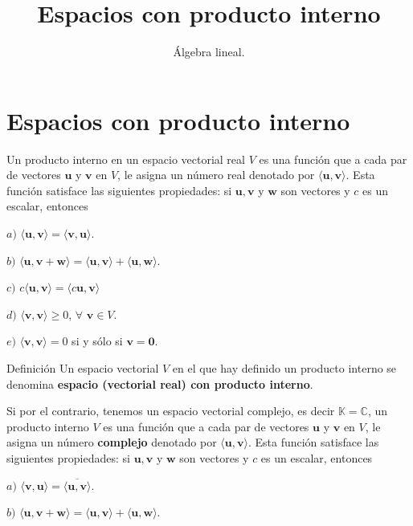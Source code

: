 \documentclass[
]{article}
\title{Espacios con producto interno}
\author{Álgebra lineal.}
\date{}
\begin{document}
\maketitle

\hypertarget{espacios-con-producto-interno}{%
\section{Espacios con producto
interno}\label{espacios-con-producto-interno}}

Un producto interno en un espacio vectorial real \(V\) es una función
que a cada par de vectores \(\mathbf{u}\) y \(\mathbf{v}\) en \(V\), le
asigna un número real denotado por
\(\langle \mathbf{u}, \mathbf{v}\rangle\). Esta función satisface las
siguientes propiedades: si \(\mathbf{u}, \mathbf{v}\) y \(\mathbf{w}\)
son vectores y \(c\) es un escalar, entonces

\(a)\)
\(\langle \mathbf{u}, \mathbf{v}\rangle = \langle \mathbf{v}, \mathbf{u}\rangle\).

\(b)\)
\(\langle \mathbf{u}, \mathbf{v}+\mathbf{w}\rangle  = \langle \mathbf{u}, \mathbf{v}\rangle + \langle \mathbf{u}, \mathbf{w}\rangle\).

\(c)\)
\(c\langle \mathbf{u}, \mathbf{v}\rangle = \langle c\mathbf{u}, \mathbf{v}\rangle\)

\(d)\) \(\langle \mathbf{v}, \mathbf{v}\rangle \geq 0\),
\(\forall\,\, \mathbf{v}\in V\).

\(e)\) \(\langle \mathbf{v}, \mathbf{v}\rangle = 0\) si y sólo si
\(\mathbf{v}=\mathbf{0}\).

Definición Un espacio vectorial \(V\) en el que hay definido un producto
interno se denomina \textbf{espacio (vectorial real) con producto
interno}.

Si por el contrario, tenemos un espacio vectorial complejo, es decir
\(\mathbb{K}=\mathbb{C}\), un producto interno \(V\) es una función que
a cada par de vectores \(\mathbf{u}\) y \(\mathbf{v}\) en \(V\), le
asigna un número \textbf{complejo} denotado por
\(\langle \mathbf{u}, \mathbf{v}\rangle\). Esta función satisface las
siguientes propiedades: si \(\mathbf{u}, \mathbf{v}\) y \(\mathbf{w}\)
son vectores y \(c\) es un escalar, entonces

\(a)\)
\(\langle \mathbf{v}, \mathbf{u}\rangle = \overline{\langle \mathbf{u}, \mathbf{v}\rangle}\).

\(b)\)
\(\langle \mathbf{u}, \mathbf{v}+\mathbf{w}\rangle  = \langle \mathbf{u}, \mathbf{v}\rangle + \langle \mathbf{u}, \mathbf{w}\rangle\).
\end{document}
